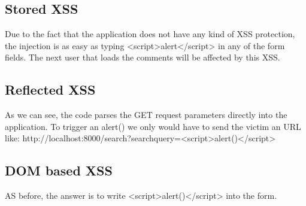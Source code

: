 \begin{Answer}[ref={websec-xss-types}]
	\subsection{Stored XSS}
	Due to the fact that the application does not have any kind of XSS protection, the injection is as easy as typing <script>alert</script> in any of the form fields. The next user that loads the comments will be affected by this XSS.
	\subsection{Reflected XSS}
	As we can see, the code parses the GET request parameters directly into the application. To trigger an alert() we only would have to send the victim an URL like: http://localhost:8000/search?searchquery=<script>alert()</script>
	\subsection{DOM based XSS}
	AS before, the answer is to write <script>alert()</script> into the form.
\end{Answer}